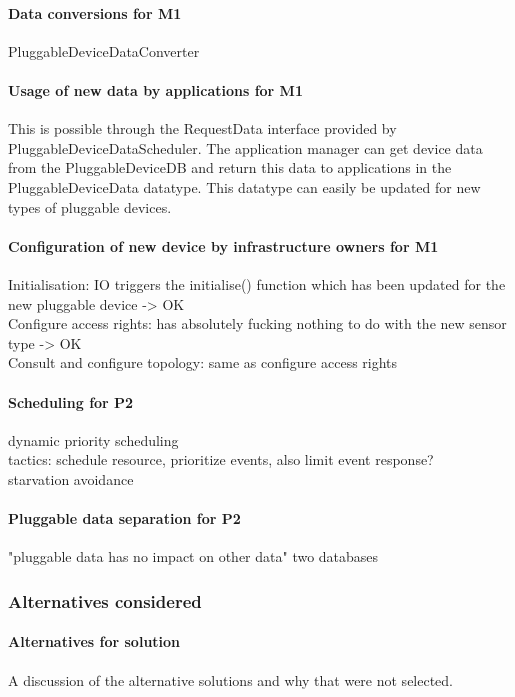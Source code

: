     \paragraph{Data conversions for M1}
        PluggableDeviceDataConverter

    \paragraph{Usage of new data by applications for M1}
        This is possible through the RequestData interface provided by PluggableDeviceDataScheduler.
        The application manager can get device data from the PluggableDeviceDB and return this
        data to applications in the PluggableDeviceData datatype. This datatype can easily be
        updated for new types of pluggable devices.

    \paragraph{Configuration of new device by infrastructure owners for M1}
        Initialisation: IO triggers the initialise() function which has been
        updated for the new pluggable device -> OK\\
        Configure access rights: has absolutely fucking nothing to do with the
        new sensor type -> OK \\
        Consult and configure topology: same as configure access rights

    \paragraph{Scheduling for P2}
        dynamic priority scheduling \\
        tactics: schedule resource, prioritize events, also limit event response?\\
        starvation avoidance

    \paragraph{Pluggable data separation for P2}
        "pluggable data has no impact on other data"
        two databases

    \subsubsection{Alternatives considered}
        \paragraph{Alternatives for solution}
            A discussion of the alternative solutions and why that were not selected.


